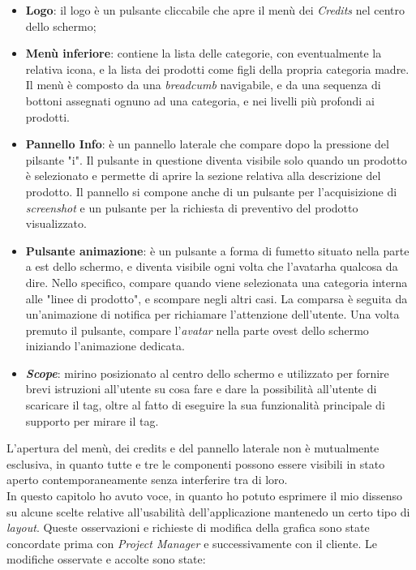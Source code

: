 \begin{itemize}
	\item \textbf{Logo}: il logo \`e un pulsante cliccabile che apre il men\`u dei \textit{Credits} nel centro dello schermo;
	\item \textbf{Men\`u inferiore}: contiene la lista delle categorie, con eventualmente la relativa icona, e la lista dei prodotti come figli della propria categoria madre. Il men\`u \`e composto da una \textit{breadcumb} navigabile, e da una sequenza di bottoni assegnati ognuno ad una categoria, e nei livelli pi\`u profondi ai prodotti.
	\item \textbf{Pannello Info}: \`e un pannello laterale che compare dopo la pressione del pilsante "i". Il pulsante in questione diventa visibile solo quando un prodotto \`e selezionato e permette di aprire la sezione relativa alla descrizione del prodotto. Il pannello si compone anche di un pulsante per l'acquisizione di \textit{screenshot} e un pulsante per la richiesta di preventivo del prodotto visualizzato.
	\item \textbf{Pulsante animazione}: \`e un pulsante a forma di fumetto situato nella parte a est dello schermo, e diventa visibile ogni volta che l'avatar\gloss ha qualcosa da dire. Nello specifico, compare quando viene selezionata una categoria interna alle "linee di prodotto", e scompare negli altri casi. La comparsa \`e seguita da un'animazione di notifica per richiamare l'attenzione dell'utente. Una volta premuto il pulsante, compare l'\textit{avatar\gloss} nella parte ovest dello schermo iniziando l'animazione dedicata.
	\item \textbf{\textit{Scope}}: mirino posizionato al centro dello schermo e utilizzato per fornire brevi istruzioni all'utente su cosa fare e dare la possibilit\`a all'utente di scaricare il tag, oltre al fatto di eseguire la sua funzionalit\`a principale di supporto per mirare il tag.
\end{itemize}

L'apertura del men\`u, dei credits e del pannello laterale non \`e mutualmente esclusiva, in quanto tutte e tre le componenti possono essere visibili in stato aperto contemporaneamente senza interferire tra di loro.\\


In questo capitolo ho avuto voce, in quanto ho potuto esprimere il mio dissenso su alcune scelte relative all'usabilit\`a dell'applicazione mantenedo un certo tipo di \textit{layout}. Queste osservazioni e richieste di modifica della grafica sono state concordate prima con \textit{Project Manager} e successivamente con il cliente. Le modifiche osservate e accolte sono state:

